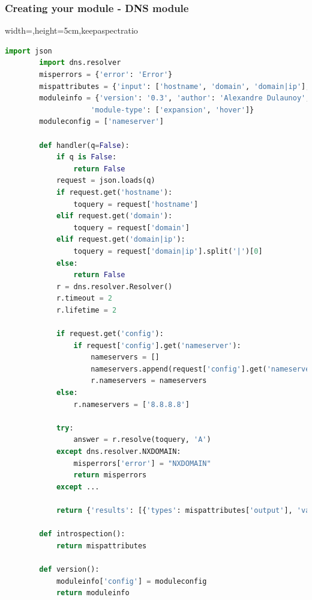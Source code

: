  \begin{frame}[fragile]
      \frametitle{Creating your module - DNS module}
      \begin{adjustbox}{width=\textwidth,height=5cm,keepaspectratio}
      \begin{lstlisting}[language=python]
        import json
        import dns.resolver
        misperrors = {'error': 'Error'}
        mispattributes = {'input': ['hostname', 'domain', 'domain|ip'], 'output': ['ip-src','ip-dst']}
        moduleinfo = {'version': '0.3', 'author': 'Alexandre Dulaunoy','description': 'Simple DNS expansion service to resolve IP address from MISP attributes',
                    'module-type': ['expansion', 'hover']}
        moduleconfig = ['nameserver']

        def handler(q=False):
            if q is False:
                return False
            request = json.loads(q)
            if request.get('hostname'):
                toquery = request['hostname']
            elif request.get('domain'):
                toquery = request['domain']
            elif request.get('domain|ip'):
                toquery = request['domain|ip'].split('|')[0]
            else:
                return False
            r = dns.resolver.Resolver()
            r.timeout = 2
            r.lifetime = 2

            if request.get('config'):
                if request['config'].get('nameserver'):
                    nameservers = []
                    nameservers.append(request['config'].get('nameserver'))
                    r.nameservers = nameservers
            else:
                r.nameservers = ['8.8.8.8']

            try:
                answer = r.resolve(toquery, 'A')
            except dns.resolver.NXDOMAIN:
                misperrors['error'] = "NXDOMAIN"
                return misperrors
            except ...

            return {'results': [{'types': mispattributes['output'], 'values':[str(answer[0])]}]}

        def introspection():
            return mispattributes

        def version():
            moduleinfo['config'] = moduleconfig
            return moduleinfo
        \end{lstlisting}
        \end{adjustbox}
\end{frame}

